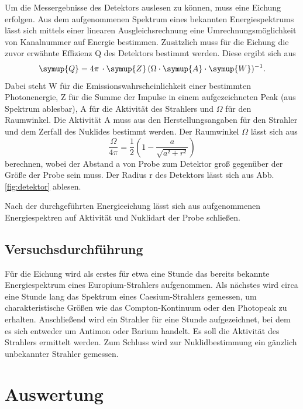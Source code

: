     \noindent
    Um die Messergebnisse des Detektors auslesen zu können, muss eine Eichung erfolgen.
    Aus dem aufgenommenen Spektrum eines bekannten Energiespektrums lässt sich mittels einer linearen
    Ausgleichsrechnung eine Umrechnungsmöglichkeit von Kanalnummer auf Energie bestimmen.
    Zusätzlich muss für die Eichung die zuvor erwähnte Effizienz Q des Detektors bestimmt werden.
    Diese ergibt sich aus
    \begin{align}
      \symup{Q} = 4\pi\,\cdot\symup{Z}\,(\Omega\cdot\symup{A}\cdot\symup{W})^{-1}.
    \end{align}
    Dabei steht W für die Emissionswahrscheinlichkeit einer bestimmten Photonenergie, Z für
    die Summe der Impulse in einem aufgezeichneten Peak (aus Spektrum ablesbar), A für die
    Aktivität des Strahlers und $\Omega$ für den Raumwinkel. Die Aktivität A muss aus den
    Herstellungsangaben für den Strahler und dem Zerfall des Nuklides bestimmt werden. Der
    Raumwinkel $\Omega$ lässt sich aus
    \begin{equation}
      \frac{\Omega}{4\pi}=\frac12\left(1-\frac a{\sqrt{a²+r²}}\right)
      \label{eqn:raum}
    \end{equation}
    berechnen, wobei der Abstand a von Probe zum Detektor groß gegenüber der Größe der Probe sein muss.
    Der Radius r des Detektors lässt sich aus Abb. \ref{fig:detektor} ablesen.

    Nach der durchgeführten Energieeichung lässt sich aus aufgenommenen Energiespektren
    auf Aktivität und Nuklidart der Probe schließen.

    \subsection{Versuchsdurchführung}

    Für die Eichung wird als erstes für etwa eine Stunde das bereits bekannte Energiespektrum eines
    Europium-Strahlers aufgenommen.
    Als nächstes wird circa eine Stunde lang das Spektrum eines Caesium-Strahlers
    gemessen, um charakteristische Größen wie das Compton-Kontinuum oder
    den Photopeak zu erhalten.
    Anschließend wird ein Strahler für eine Stunde
    aufgezeichnet, bei dem es sich entweder um Antimon oder Barium handelt. Es soll die Aktivität des
    Strahlers ermittelt werden.
    Zum Schluss wird zur Nuklidbestimmung ein gänzlich unbekannter Strahler gemessen.



\section{Auswertung}


